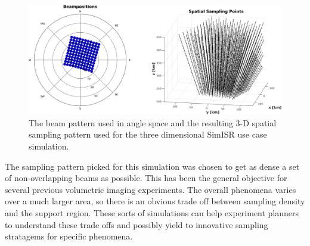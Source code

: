 \begin{figure}[!t]
\centering
\includegraphics[width=6in]{Sampling3d}
\caption{The beam pattern used in angle space and the resulting 3-D spatial sampling pattern used for the three dimensional SimISR use case simulation.}
\label{fig:3dsampling}
\end{figure}

The sampling pattern picked for this simulation was chosen to get as dense a set of non-overlapping beams as possible.  This has been the general objective for several previous volumetric imaging experiments.
The overall phenomena varies over a much larger area, so there is an obvious trade off between sampling density and the support region. These sorts of simulations can help experiment planners to understand these trade offs and possibly yield to innovative sampling stratagems for specific phenomena. 

